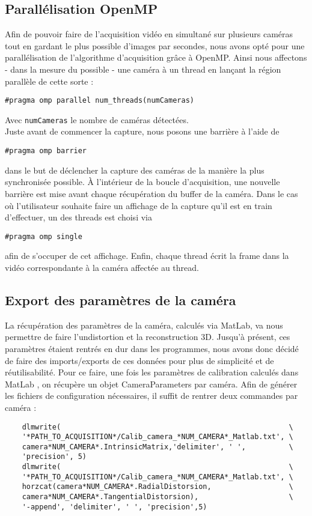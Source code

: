 \subsection{Parallélisation OpenMP}
Afin de pouvoir faire de l'acquisition vidéo en simultané sur plusieurs caméras tout en gardant le plus possible d'images par secondes, nous avons opté pour une parallélisation de l'algorithme d'acquisition grâce à OpenMP. Ainsi nous affectons - dans la mesure du possible - une caméra à un thread en lançant la région parallèle de cette sorte :
\begin{verbatim}
#pragma omp parallel num_threads(numCameras)
\end{verbatim}
Avec \texttt{numCameras} le nombre de caméras détectées. \\
Juste avant de commencer la capture, nous posons une barrière à l'aide de 
\begin{verbatim}
#pragma omp barrier
\end{verbatim}
dans le but de déclencher la capture des caméras de la manière la plus synchronisée possible.
À l'intérieur de la boucle d'acquisition, une nouvelle barrière est mise avant chaque récupération du buffer de la caméra.
Dans le cas où l'utilisateur souhaite faire un affichage de la capture qu'il est en train d'effectuer, un des threads est choisi via
\begin{verbatim}
#pragma omp single
\end{verbatim}
afin de s'occuper de cet affichage.
Enfin, chaque thread écrit la frame dans la vidéo correspondante à la caméra affectée au thread.

\subsection{Export des paramètres de la caméra}

La récupération des paramètres de la caméra, calculés via MatLab, va nous permettre de faire l'undistortion et la reconstruction 3D. Jusqu'à présent, ces paramètres étaient rentrés en dur dans les programmes, nous avons donc décidé de faire des imports/exports de ces données pour plus de simplicité et de réutilisabilité.
Pour ce faire, une fois les paramètres de calibration calculés dans MatLab , on récupère un objet CameraParameters par caméra. Afin de générer les fichiers de configuration nécessaires, il suffit de rentrer deux commandes par caméra :

\begin{verbatim}
	dlmwrite( 													  \
	'*PATH_TO_ACQUISITION*/Calib_camera_*NUM_CAMERA*_Matlab.txt', \
	camera*NUM_CAMERA*.IntrinsicMatrix,'delimiter', ' ',		  \
	'precision', 5)
	dlmwrite(													  \
	'*PATH_TO_ACQUISITION*/Calib_camera_*NUM_CAMERA*_Matlab.txt', \
	horzcat(camera*NUM_CAMERA*.RadialDistorsion,				  \
	camera*NUM_CAMERA*.TangentialDistorsion),					  \
	'-append', 'delimiter', ' ', 'precision',5)
\end{verbatim}

